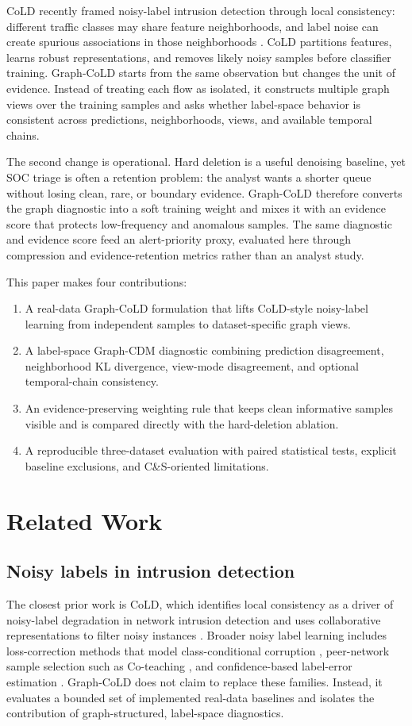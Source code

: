\documentclass[preprint,review,12pt]{elsarticle}
\begin{document}
CoLD recently framed noisy-label intrusion detection through local consistency:
different traffic classes may share feature neighborhoods, and label noise can
create spurious associations in those neighborhoods \cite{yang2026cold}. CoLD
partitions features, learns robust representations, and removes likely noisy
samples before classifier training. Graph-CoLD starts from the same observation
but changes the unit of evidence. Instead of treating each flow as isolated, it
constructs multiple graph views over the training samples and asks whether
label-space behavior is consistent across predictions, neighborhoods, views, and
available temporal chains.

The second change is operational. Hard deletion is a useful denoising baseline,
yet SOC triage is often a retention problem: the analyst wants a shorter queue
without losing clean, rare, or boundary evidence. Graph-CoLD therefore converts
the graph diagnostic into a soft training weight and mixes it with an evidence
score that protects low-frequency and anomalous samples. The same diagnostic and
evidence score feed an alert-priority proxy, evaluated here through compression
and evidence-retention metrics rather than an analyst study.

This paper makes four contributions:
\begin{enumerate}
\item A real-data Graph-CoLD formulation that lifts CoLD-style noisy-label
learning from independent samples to dataset-specific graph views.
\item A label-space Graph-CDM diagnostic combining prediction disagreement,
neighborhood KL divergence, view-mode disagreement, and optional temporal-chain
consistency.
\item An evidence-preserving weighting rule that keeps clean informative samples
visible and is compared directly with the hard-deletion ablation.
\item A reproducible three-dataset evaluation with paired statistical tests,
explicit baseline exclusions, and C\&S-oriented limitations.
\end{enumerate}

\section{Related Work}
\subsection{Noisy labels in intrusion detection}
The closest prior work is CoLD, which identifies local consistency as a driver
of noisy-label degradation in network intrusion detection and uses collaborative
representations to filter noisy instances \cite{yang2026cold}. Broader noisy
label learning includes loss-correction methods that model class-conditional
corruption \cite{patrini2017loss}, peer-network sample selection such as
Co-teaching \cite{han2018coteaching}, and confidence-based label-error
estimation \cite{northcutt2021confident}. Graph-CoLD does not claim to replace
these families. Instead, it evaluates a bounded set of implemented real-data
baselines and isolates the contribution of graph-structured, label-space
diagnostics.
\end{document}
